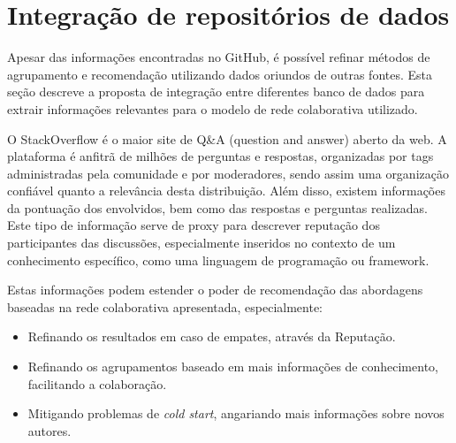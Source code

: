 \documentclass[a4paper,12pt]{monografia}
\theoremstyle{plain}
\theoremstyle{definition}
\theoremstyle{remark}
\begin{document}
\begin{table}[!h]
\centering
{}
\caption{Descrição dos Respositórios Selecionados}
\label{tab:repos}
\end{table}

\section{Integração de repositórios de dados}

Apesar das informações encontradas no GitHub, é possível refinar métodos de agrupamento e recomendação utilizando dados oriundos de outras fontes. Esta seção descreve a proposta de integração entre diferentes banco de dados para extrair informações relevantes para o modelo de rede colaborativa utilizado.

O StackOverflow é o maior site de Q&A (question and answer) aberto da web. A plataforma é anfitrã de milhões de perguntas e respostas, organizadas por tags administradas pela comunidade e por moderadores, sendo assim uma organização confiável quanto a relevância desta distribuição. Além disso, existem informações da pontuação dos envolvidos, bem como das respostas e perguntas realizadas. Este tipo de informação serve de proxy para descrever reputação dos participantes das discussões, especialmente inseridos no contexto de um conhecimento específico, como uma linguagem de programação ou framework.

Estas informações podem estender o poder de recomendação das abordagens baseadas na rede colaborativa apresentada, especialmente:


\begin{itemize}
  \item Refinando os resultados em caso de empates, através da Reputação.

  \item Refinando os agrupamentos baseado em mais informações de conhecimento, facilitando a colaboração.

  \item Mitigando problemas de \textit{cold start}, angariando mais informações sobre novos autores.
\end{itemize}
\end{document}
